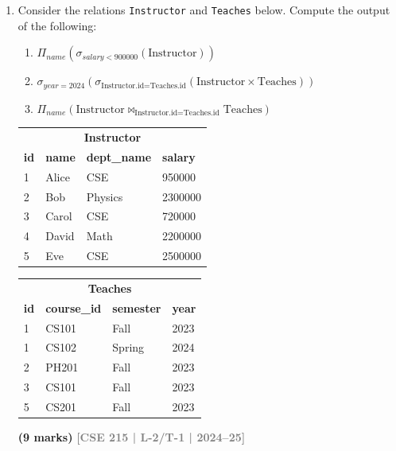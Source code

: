 \documentclass[12pt]{article}
\newcommand{\yr}[1]{\hfill\textcolor{gray}{\small\textbf{[#1]}}}
\newcommand{\mk}[1]{\textcolor{orange!70!black}{\small\textbf{(#1 marks)}}}
\begin{document}
\begin{enumerate}

\item Consider the relations \texttt{Instructor} and \texttt{Teaches} below. Compute the output of the following:
\begin{enumerate}
  \item $\Pi_{name}(\sigma_{salary < 900000}(\text{Instructor}))$
  \item $\sigma_{year=2024}(\sigma_{\text{Instructor.id}=\text{Teaches.id}}(\text{Instructor} \times \text{Teaches}))$
  \item $\Pi_{name}(\text{Instructor} \bowtie_{\text{Instructor.id}=\text{Teaches.id}} \text{Teaches})$
\end{enumerate}
\begin{center}
\small
\begin{tabular}{llll}
\toprule
\multicolumn{4}{c}{\textbf{Instructor}}\\
\textbf{id} & \textbf{name} & \textbf{dept\_name} & \textbf{salary}\\
\midrule
1 & Alice & CSE     & 950000\\
2 & Bob   & Physics & 2300000\\
3 & Carol & CSE     & 720000\\
4 & David & Math    & 2200000\\
5 & Eve   & CSE     & 2500000\\
\bottomrule
\end{tabular}
\quad
\begin{tabular}{llll}
\toprule
\multicolumn{4}{c}{\textbf{Teaches}}\\
\textbf{id} & \textbf{course\_id} & \textbf{semester} & \textbf{year}\\
\midrule
1 & CS101 & Fall   & 2023\\
1 & CS102 & Spring & 2024\\
2 & PH201 & Fall   & 2023\\
3 & CS101 & Fall   & 2023\\
5 & CS201 & Fall   & 2023\\
\bottomrule
\end{tabular}
\end{center}
\mk{9} \yr{CSE 215 | L-2/T-1 | 2024--25}




\end{enumerate}
\end{document}

